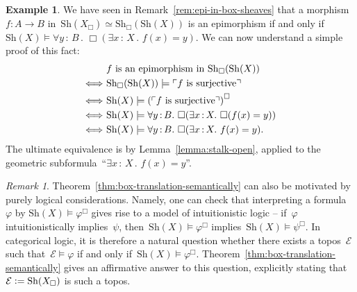 \documentclass[10pt,reqno,a4paper]{amsbook}
\theoremstyle{definition}
\newtheorem{ex}[defn]{Example}
\theoremstyle{plain}
\theoremstyle{remark}
\newtheorem{rem}[defn]{Remark}
\newcommand{\E}{\mathcal{E}}
\newcommand{\Sh}{\mathrm{Sh}}
\newcommand{\?}{\,{:}\,}
\renewcommand{\_}{\mathpunct{.}\,}
\newcommand{\speak}[1]{\ulcorner\text{\textnormal{#1}}\urcorner}
\newcommand{\defeq}{\vcentcolon=}
\begin{document}
\begin{ex}We have seen in Remark~\ref{rem:epi-in-box-sheaves} that a
morphism~$f : A \to B$ in~$\Sh(X_\Box) \simeq \Sh_\Box(\Sh(X))$ is an
epimorphism if and only if~$\Sh(X) \models \forall y\?B\_ \Box(\exists x\?X\_
f(x) = y)$. We can now understand a simple proof of this fact:
\begin{align*}
  &\ \text{$f$ is an epimorphism in~$\Sh_\Box(\Sh(X))$} \\
  \Longleftrightarrow&\
    \Sh_\Box(\Sh(X)) \models \speak{$f$ is surjective} \\
  \Longleftrightarrow&\
    \Sh(X) \models \left(\speak{$f$ is surjective}\right)^\Box \\
  \Longleftrightarrow&\
    \Sh(X) \models \forall y\?B\_ \Box(\exists x\?X\_ \Box(f(x) = y)) \\
  \Longleftrightarrow&\
    \Sh(X) \models \forall y\?B\_ \Box(\exists x\?X\_ f(x) = y).
\end{align*}
The ultimate equivalence is by Lemma~\ref{lemma:stalk-open}, applied to the
geometric subformula~``$\exists x\?X\_ f(x) = y$''.
\end{ex}

\begin{rem}Theorem~\ref{thm:box-translation-semantically} can also be motivated
by purely logical considerations. Namely, one can check that interpreting a
formula~$\varphi$ by $\Sh(X) \models \varphi^\Box$ gives rise to a model of
intuitionistic logic -- if~$\varphi$ intuitionistically implies~$\psi$,
then~$\Sh(X) \models \varphi^\Box$ implies~$\Sh(X) \models \psi^\Box$. In
categorical logic, it is therefore a natural question whether there exists a
topos~$\E$ such that~$\E \models \varphi$ if and only if~$\Sh(X) \models
\varphi^\Box$. Theorem~\ref{thm:box-translation-semantically} gives an
affirmative answer to this question, explicitly stating that~$\E \defeq
\Sh(X_\Box)$ is such a topos.\end{rem}
\end{document}
